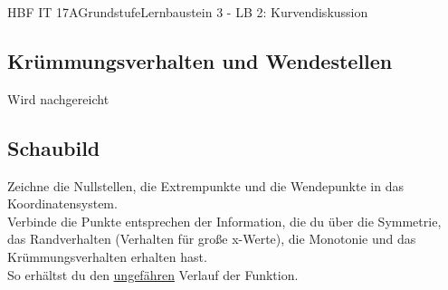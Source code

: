 \documentclass[11pt,twocolumn,oneside,openany,headings=optiontotoc,11pt,numbers=noenddot]{article}
\begin{document}
\begin{worksheet}{HBF IT 17A}{Grundstufe}{Lernbaustein 3 - LB 2: Kurvendiskussion}
		\subsection*{Krümmungsverhalten und Wendestellen} \color{red}Wird nachgereicht\normalcolor
		\subsection*{Schaubild} Zeichne die Nullstellen, die Extrempunkte und die Wendepunkte in das Koordinatensystem.\\
		Verbinde die Punkte entsprechen der Information, die du über die Symmetrie, das Randverhalten (Verhalten für große x-Werte), die Monotonie und das Krümmungsverhalten erhalten hast.\\
		So erhältst du den \underline{ungefähren} Verlauf der Funktion.
	\end{worksheet}
\end{document}
